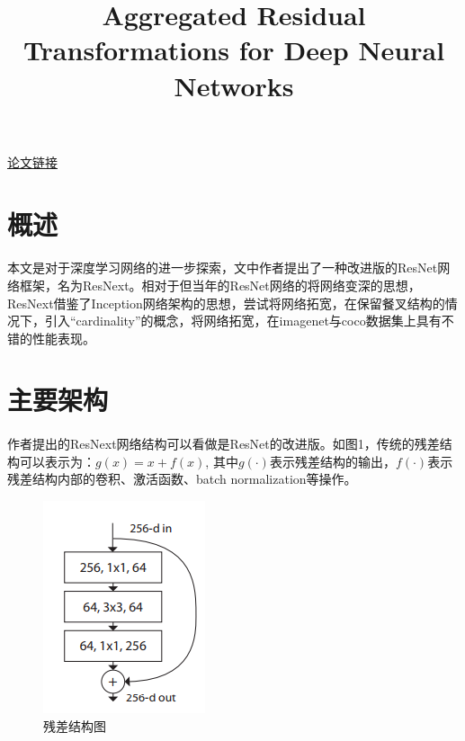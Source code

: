 \documentclass{article}
\title{Aggregated Residual Transformations for Deep Neural Networks}
\date{}
\begin{document}
\maketitle
\begin{center}
\fontsize{14pt}{14pt}\href{https://arxiv.org/pdf/1611.05431.pdf}{论文链接}
\end{center}
\section{概述}

\paragraph{} 
本文是对于深度学习网络的进一步探索，文中作者提出了一种改进版的ResNet网络框架，名为ResNext。相对于但当年的ResNet网络的将网络变深的思想，ResNext借鉴了Inception网络架构的思想，尝试将网络拓宽，在保留餐叉结构的情况下，引入“cardinality”的概念，将网络拓宽，在imagenet与coco数据集上具有不错的性能表现。
\section{主要架构}
\paragraph{}
作者提出的ResNext网络结构可以看做是ResNet的改进版。如图1，传统的残差结构可以表示为：$g(x)=x+f(x)$, 其中$g(\cdot)$表示残差结构的输出，$f(\cdot)$表示残差结构内部的卷积、激活函数、batch normalization等操作。
\begin{figure}[ht]
\centering
\includegraphics[scale=0.8]{figure1.png}
\caption{残差结构图}
\label{fig:label}
\end{figure}
\end{document}

